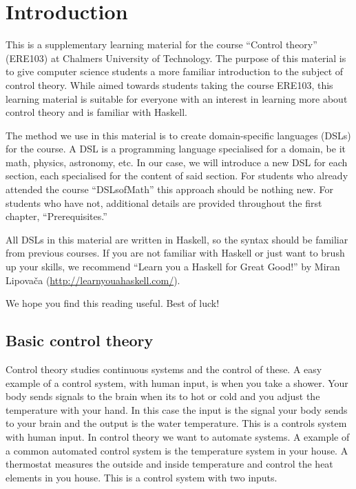 \section{Introduction}

This is a supplementary learning material for the course ``Control theory'' (ERE103) at Chalmers University of Technology. The purpose of this material is to give computer science students a more familiar introduction to the subject of control theory. While aimed towards students taking the course ERE103, this learning material is suitable for everyone with an interest in learning more about control theory and is familiar with Haskell. 

The method we use in this material is to create domain-specific languages (DSLs) for the course. A DSL is a programming language specialised for a domain, be it math, physics, astronomy, etc. In our case, we will introduce a new DSL for each section, each specialised for the content of said section. For students who already attended the course ``DSLsofMath'' this approach should be nothing new. For students who have not, additional details are provided throughout the first chapter, ``Prerequisites.''

All DSLs in this material are written in Haskell, so the syntax should be familiar from previous courses. If you are not familiar with Haskell or just want to brush up your skills, we recommend ``Learn you a Haskell for Great Good!'' by Miran Lipovača (\href{http://learnyouahaskell.com/}{http://learnyouahaskell.com/}). 

We hope you find this reading useful. Best of luck!



\subsection{Basic control theory}

Control theory studies continuous systems and the control of these. A easy example of a control system, with human input, is when you take a shower. Your body sends signals to the brain when its to hot or cold and you adjust the temperature with your hand. In this case the input is the signal your body sends to your brain and the output is the water temperature. This is a controls system with human input. In control theory we want to automate systems. A example of a common automated control system is the temperature system in your house. A thermostat measures the outside and inside temperature and control the heat elements in you house. This is a control system with two inputs.

